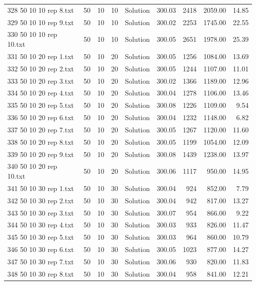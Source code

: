\begin{longtable}{lrrllrrrr}
328 50 10 10 rep 8.txt & 50 & 10 & 10 & Solution & 300.03 & 2418 & 2059.00 & 14.85\\
329 50 10 10 rep 9.txt & 50 & 10 & 10 & Solution & 300.02 & 2253 & 1745.00 & 22.55\\
330 50 10 10 rep 10.txt & 50 & 10 & 10 & Solution & 300.05 & 2651 & 1978.00 & 25.39\\
331 50 10 20 rep 1.txt & 50 & 10 & 20 & Solution & 300.05 & 1256 & 1084.00 & 13.69\\
332 50 10 20 rep 2.txt & 50 & 10 & 20 & Solution & 300.05 & 1244 & 1107.00 & 11.01\\
333 50 10 20 rep 3.txt & 50 & 10 & 20 & Solution & 300.02 & 1366 & 1189.00 & 12.96\\
334 50 10 20 rep 4.txt & 50 & 10 & 20 & Solution & 300.04 & 1278 & 1106.00 & 13.46\\
335 50 10 20 rep 5.txt & 50 & 10 & 20 & Solution & 300.08 & 1226 & 1109.00 &  9.54\\
336 50 10 20 rep 6.txt & 50 & 10 & 20 & Solution & 300.04 & 1232 & 1148.00 &  6.82\\
337 50 10 20 rep 7.txt & 50 & 10 & 20 & Solution & 300.05 & 1267 & 1120.00 & 11.60\\
338 50 10 20 rep 8.txt & 50 & 10 & 20 & Solution & 300.05 & 1199 & 1054.00 & 12.09\\
339 50 10 20 rep 9.txt & 50 & 10 & 20 & Solution & 300.08 & 1439 & 1238.00 & 13.97\\
340 50 10 20 rep 10.txt & 50 & 10 & 20 & Solution & 300.06 & 1117 & 950.00 & 14.95\\
341 50 10 30 rep 1.txt & 50 & 10 & 30 & Solution & 300.04 & 924 & 852.00 &  7.79\\
342 50 10 30 rep 2.txt & 50 & 10 & 30 & Solution & 300.04 & 942 & 817.00 & 13.27\\
343 50 10 30 rep 3.txt & 50 & 10 & 30 & Solution & 300.07 & 954 & 866.00 &  9.22\\
344 50 10 30 rep 4.txt & 50 & 10 & 30 & Solution & 300.03 & 933 & 826.00 & 11.47\\
345 50 10 30 rep 5.txt & 50 & 10 & 30 & Solution & 300.03 & 964 & 860.00 & 10.79\\
346 50 10 30 rep 6.txt & 50 & 10 & 30 & Solution & 300.05 & 1023 & 877.00 & 14.27\\
347 50 10 30 rep 7.txt & 50 & 10 & 30 & Solution & 300.06 & 930 & 820.00 & 11.83\\
348 50 10 30 rep 8.txt & 50 & 10 & 30 & Solution & 300.04 & 958 & 841.00 & 12.21\\

\end{longtable}

